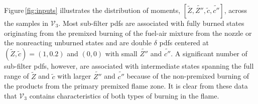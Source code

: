 \documentclass[review]{elsarticle}
\newcommand{\wt}[1]{\widetilde{#1}}
\begin{document}

Figure\,\ref{fig:inputs} illustrates the distribution of moments,
$\left[\wt{Z}, \wt{Z''}, \wt{c}, \wt{c''}\right]$, across the samples
in $\mathcal{V}_3$. Most sub-filter \glspl{pdf} are associated with
fully burned states originating from the premixed burning of the
fuel-air mixture from the nozzle or the nonreacting unburned states
and are double $\delta$ \glspl{pdf} centered at
$\left( \wt{Z}, \wt{c} \right) = (1,0.2)$ and $(0,0)$ with small
$\wt{Z''}$ and $\wt{c''}$. A significant number of sub-filter
\glspl{pdf}, however, are associated with intermediate states spanning the full
range of $\wt{Z}$ and $\wt{c}$ with larger $\wt{Z''}$ and $\wt{c''}$ because of
the non-premixed burning of the products from the primary
premixed flame zone. It is clear from these data that $\mathcal{V}_3$
contains characteristics of both types of burning in the flame.
\end{document}
